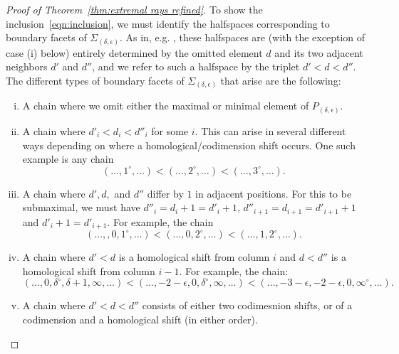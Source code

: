 \documentclass[12pt]{amsart}
\theoremstyle{definition}
\theoremstyle{remark}
\newcommand{\codim}{\operatorname{codim}}
\newcommand{\dd}{d}
\newcommand{\zp}{\circ}
\begin{document}
\begin{proof}[Proof of Theorem~\ref{thm:extremal rays refined}]
To show the inclusion~\eqref{eqn:inclusion}, we must identify the halfspaces corresponding to boundary facets of $\Sigma_{(\delta,\epsilon)}$.  
As in, e.g. \cite[Proposition~2.12]{boij-sod1}, these halfspaces are (with the exception of case (i) below) entirely determined by the omitted element $\dd$ and its two adjacent neighbors $d'$ and $d''$, and we refer to such a halfspace by the triplet $d'<d<d''$.  The different types of boundary facets of $\Sigma_{(\delta,\epsilon)}$ that arise are the following:
\begin{enumerate}[(i)]
	\item A chain where we omit either the maximal or minimal element of $P_{(\delta,\epsilon)}$.
	\item A chain where $d'_i<d_i<d''_i$ for some $i$.  This can arise in several different ways depending on where a homological/codimension shift occurs.
	One such example is any chain
	\[
(\dots,1^\zp,\dots) <(\dots, 2^\zp,\dots) <(\dots,3^\zp,\dots).
	\]
%
	\item A chain where $d', d,$ and $d''$ differ by $1$ in adjacent positions.  For this to be submaximal, we must have $d''_i=d_i+1=d'_i+1$, $d''_{i+1}=d_{i+1}=d'_{i+1}+1$ and $d'_i+1=d'_{i+1}$.  For example, the chain
			\[
(\dots,, 0,1^\zp,\dots) <(\dots, 0,2^\zp,\dots) <(\dots, 1,2^\zp,\dots) .
			\]
	\item A chain where $d'<d$ is a homological shift from column $i$ and $d<d''$ is a homological shift from column $i-1$.  For example, the chain:
		\[
		(\dots, 0,\delta^\zp,\delta+1,\infty,\dots)<(\dots, -2-\epsilon,0,\delta^\zp,\infty,\dots)<(\dots, -3-\epsilon,-2-\epsilon,0,\infty^\zp,\dots).
		\]
	\item A chain where $d'<d<d''$ consists of either two codimesnion shifts, or of a codimension and a homological shift (in either order).

\end{enumerate}
\end{proof}
\end{document}
